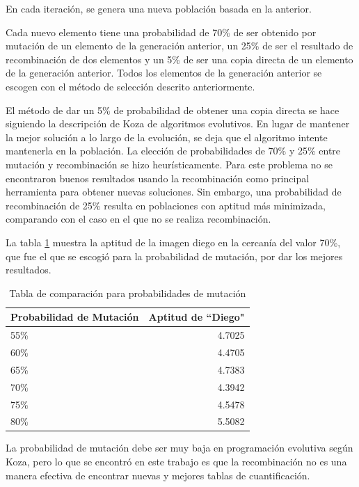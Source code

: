 En cada iteración, se genera una nueva población basada en la anterior.

Cada nuevo elemento tiene una probabilidad de 70\% de ser obtenido por mutación
de un elemento de la generación anterior, un 25\% de ser el resultado de
recombinación de dos elementos y un 5\% de ser una copia directa de un
elemento de la generación anterior. Todos los elementos de la generación
anterior se escogen con el método de selección descrito anteriormente.

El método de dar un 5\% de probabilidad de obtener una copia directa se hace
siguiendo la descripción de Koza de algoritmos evolutivos. En lugar de mantener
la mejor solución a lo largo de la evolución, se deja que el algoritmo intente
mantenerla en la población. La elección de probabilidades de 70\% y 25\% entre
mutación y recombinación se hizo heurísticamente. Para este problema no se
encontraron buenos resultados usando la recombinación como principal
herramienta para obtener nuevas soluciones. Sin embargo, una probabilidad de
recombinación de 25\% resulta en poblaciones con aptitud más minimizada,
comparando con el caso en el que no se realiza recombinación.

La tabla \ref{table:mut_prob} muestra la aptitud de la imagen diego en la
cercanía del valor 70\%, que fue el que se escogió para la probabilidad de
mutación, por dar los mejores resultados.

\begin{table}[h!]
    \begin{tabular}{ | l | r | }
        \hline
         Probabilidad de Mutación & Aptitud de ``Diego"  \\
        \hline
          55\%        & 4.7025 \\
          60\%        & 4.4705 \\
          65\%        & 4.7383 \\
        \hline
          70\%        & 4.3942 \\
        \hline
          75\%        & 4.5478 \\
          80\%        & 5.5082 \\
        \hline
    \end{tabular}
    \caption{Tabla de comparación para probabilidades de mutación}
    \label{table:mut_prob}
\end{table}

La probabilidad de mutación debe ser muy baja en programación evolutiva según
Koza\cite{koza}, pero lo que se encontró en este trabajo es que la recombinación no
es una manera efectiva de encontrar nuevas y mejores tablas de cuantificación.


